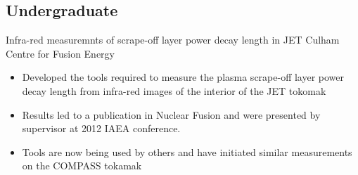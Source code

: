 \documentclass[11pt,a4paper,sans]{moderncv}        %
\begin{document}
\subsection{Undergraduate}
\cventry{}
{Infra-red measuremnts of scrape-off layer power decay length in JET}
{\newline Culham Centre for Fusion Energy}{}{}
{\begin{itemize}%
\item Developed the tools required to measure the plasma scrape-off layer power decay length from infra-red images of the interior of the JET tokomak
\item Results led to a publication in Nuclear Fusion \cite{Arnoux2013b} and were presented by supervisor at 2012 IAEA conference.
\item Tools are now being used by others and have initiated similar measurements on the COMPASS tokamak
\end{itemize}}

\nocite{*}


\end{document}
